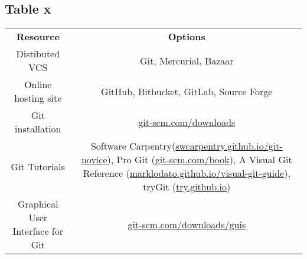 \subsection{Table x}

\begin{tabular}{ c c }
    \textbf{Resource} & \textbf{Options} \\ 
    Distibuted VCS & Git, Mercurial, Bazaar \\ 
    Online hosting site & GitHub, Bitbucket, GitLab, Source Forge \\ 
    Git installation & \href{git-scm.com/downloads}{git-scm.com/downloads} \\ 
    Git Tutorials & Software Carpentry(\href{swcarpentry.github.io/git-novice}{swcarpentry.github.io/git-novice}), Pro Git (\href{git-scm.com/book}{git-scm.com/book}), A Visual Git Reference (\href{marklodato.github.io/visual-git-guide}{marklodato.github.io/visual-git-guide}), tryGit (\href{try.github.io}{try.github.io}) \\ 
    Graphical User Interface for Git & \href{git-scm.com/downloads/guis}{git-scm.com/downloads/guis} \\ 
\end{tabular}